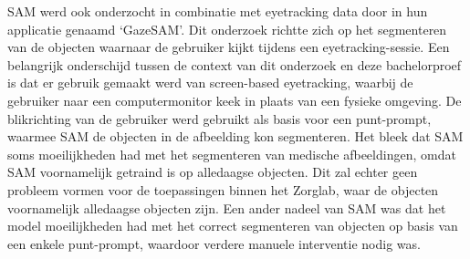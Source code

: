 SAM werd ook onderzocht in combinatie met eyetracking data door \textcite{Wang2023} in hun applicatie genaamd `GazeSAM'. Dit onderzoek richtte zich op het segmenteren van de objecten waarnaar de gebruiker kijkt tijdens een eyetracking-sessie.
Een belangrijk onderschijd tussen de context van dit onderzoek en deze bachelorproef is dat er gebruik gemaakt werd van screen-based eyetracking, waarbij de gebruiker naar een computermonitor keek in plaats van een fysieke omgeving.
De blikrichting van de gebruiker werd gebruikt als basis voor een punt-prompt, waarmee SAM de objecten in de afbeelding kon segmenteren. Het bleek dat SAM soms moeilijkheden had met het segmenteren van medische afbeeldingen, omdat 
SAM voornamelijk getraind is op alledaagse objecten. Dit zal echter geen probleem vormen voor de toepassingen binnen het Zorglab, waar de objecten voornamelijk alledaagse objecten zijn. Een ander nadeel van SAM was dat het model 
moeilijkheden had met het correct segmenteren van objecten op basis van een enkele punt-prompt, waardoor verdere manuele interventie nodig was.